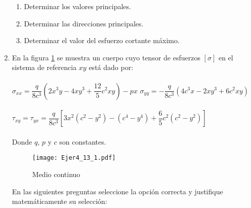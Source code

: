 \documentclass[../notas medios.tex]{subfiles}
\begin{document}
\begin{enumerate}
	\begin{enumerate}
		\item Determinar los valores principales.
		\item Determinar las direcciones principales.
		\item Determinar el valor del esfuerzo cortante máximo.
	\end{enumerate}
\item \label{punto13} En la figura \ref{continuo} se muestra un cuerpo cuyo
tensor de esfuerzos  $[\sigma]$  en el sistema de referencia $xy$ est\'a dado  por:\\\\
	$\sigma_{xx} = \dfrac{q}{8c^3} (2x^3y - 4xy^3 + \dfrac{12}{5}c^2xy) - px$ \hspace{10mm} $\sigma_{yy} = - \dfrac{q}{8c^3} (4c^3x - 2xy^3 + 6c^2xy)$ \\\\
	$\tau_{xy} = \tau_{yx} = \dfrac{q}{8c^3} [3x^2(c^2 - y^2)- (c^4 - y^4) + \dfrac{6}{5}c^2(c^2 - y^2)] $\\\\
	Donde $q$, $p$ y $c$ son constantes.
	\begin{figure}[H]
		\centering
		\texttt{[image: Ejer4\_13\_1.pdf]} 
		\caption{Medio continuo}
		\label{continuo}
	\end{figure}
	En las siguientes preguntas seleccione la opci\'on correcta y justifique matem\'aticamente su selecci\'on:
	\begin{enumerate}
	  

\end{enumerate}
\end{enumerate}
\end{document}
